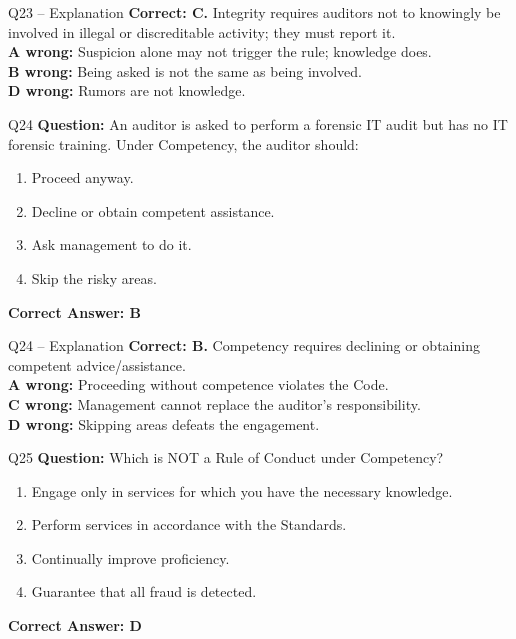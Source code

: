 \documentclass[aspectratio=169,10pt]{beamer}
\begin{document}
	\begin{frame}[t]{Q23 -- Explanation}
		\small
		\textbf{Correct: C.} Integrity requires auditors not to knowingly be involved in illegal or discreditable activity; they must report it. \\[4pt]
		\textbf{A wrong:} Suspicion alone may not trigger the rule; knowledge does. \\[2pt]
		\textbf{B wrong:} Being asked is not the same as being involved. \\[2pt]
		\textbf{D wrong:} Rumors are not knowledge.
	\end{frame}
	
	\begin{frame}[t]{Q24}
		\small
		\textbf{Question:} An auditor is asked to perform a forensic IT audit but has no IT forensic training. Under Competency, the auditor should:
		\begin{enumerate}[label=\Alph*.,itemsep=1pt,topsep=2pt]
			\item Proceed anyway.
			\item Decline or obtain competent assistance.
			\item Ask management to do it.
			\item Skip the risky areas.
		\end{enumerate}
		\vspace{4pt}
		\textbf{Correct Answer: B}
	\end{frame}
	
	\begin{frame}[t]{Q24 -- Explanation}
		\small
		\textbf{Correct: B.} Competency requires declining or obtaining competent advice/assistance. \\[4pt]
		\textbf{A wrong:} Proceeding without competence violates the Code. \\[2pt]
		\textbf{C wrong:} Management cannot replace the auditor's responsibility. \\[2pt]
		\textbf{D wrong:} Skipping areas defeats the engagement.
	\end{frame}
	
	\begin{frame}[t]{Q25}
		\small
		\textbf{Question:} Which is NOT a Rule of Conduct under Competency?
		\begin{enumerate}[label=\Alph*.,itemsep=1pt,topsep=2pt]
			\item Engage only in services for which you have the necessary knowledge.
			\item Perform services in accordance with the Standards.
			\item Continually improve proficiency.
			\item Guarantee that all fraud is detected.
		\end{enumerate}
		\vspace{4pt}
		\textbf{Correct Answer: D}
	\end{frame}
	
\end{document}
